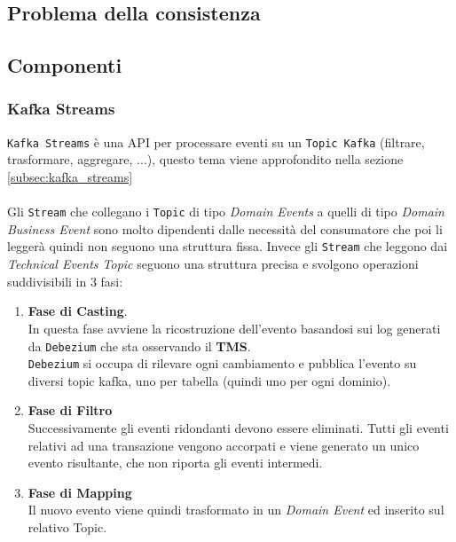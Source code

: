 \subsection{Problema della consistenza}

\subsection{Componenti}
\label{subsec:components}

\subsubsection{Kafka Streams}
\label{subsubsec:kafka_stream}
\texttt{Kafka Streams} è una API per processare eventi su un \texttt{Topic Kafka} (filtrare, trasformare, aggregare, ...), questo tema viene approfondito nella sezione \ref{subsec:kafka_streams}\\
\\
Gli \texttt{Stream} che collegano i \texttt{Topic} di tipo \textit{Domain Events} a quelli di tipo \textit{Domain Business Event} sono molto dipendenti dalle necessità del consumatore che poi li leggerà quindi non seguono una struttura fissa.
Invece gli \texttt{Stream} che leggono dai \textit{Technical Events Topic} seguono una struttura precisa e svolgono operazioni suddivisibili in 3 fasi:
\begin{enumerate}
    \item \textbf{Fase di Casting}.\\
    In questa fase avviene la ricostruzione dell'evento basandosi sui log generati da \texttt{Debezium} che sta osservando il \textbf{TMS}.\\
    \texttt{Debezium} si occupa di rilevare ogni cambiamento e pubblica l'evento su diversi topic kafka, uno per tabella (quindi uno per ogni dominio). 
    \item \textbf{Fase di Filtro}\\
    Successivamente gli eventi ridondanti devono essere eliminati. Tutti gli eventi relativi ad una transazione vengono accorpati e viene generato un unico evento risultante, che non riporta gli eventi intermedi. 
    \item \textbf{Fase di Mapping}\\
    Il nuovo evento viene quindi trasformato in un \textit{Domain Event} ed inserito sul relativo Topic.
\end{enumerate}

